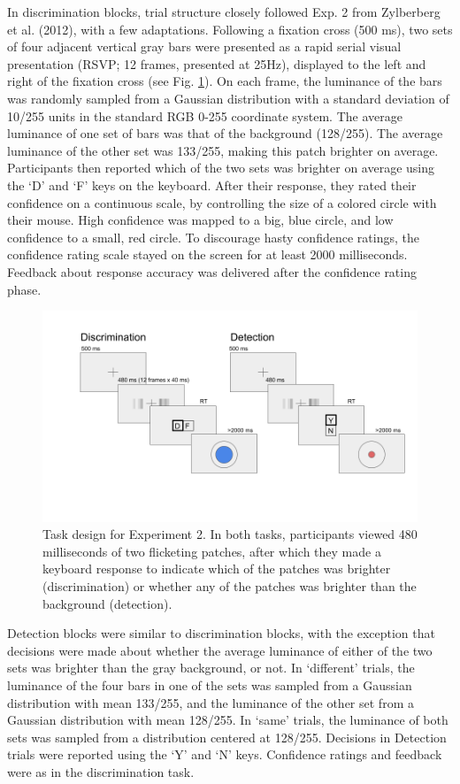 \documentclass[12pt,twoside]{reedthesis}
\begin{document}
In discrimination blocks, trial structure closely followed Exp. 2 from Zylberberg et al. (2012), with a few adaptations. Following a fixation cross (500 ms), two sets of four adjacent vertical gray bars were presented as a rapid serial visual presentation (RSVP; 12 frames, presented at 25Hz), displayed to the left and right of the fixation cross (see Fig. \ref{fig:RC-exp2-design}). On each frame, the luminance of the bars was randomly sampled from a Gaussian distribution with a standard deviation of 10/255 units in the standard RGB 0-255 coordinate system. The average luminance of one set of bars was that of the background (128/255). The average luminance of the other set was 133/255, making this patch brighter on average. Participants then reported which of the two sets was brighter on average using the `D' and `F' keys on the keyboard. After their response, they rated their confidence on a continuous scale, by controlling the size of a colored circle with their mouse. High confidence was mapped to a big, blue circle, and low confidence to a small, red circle. To discourage hasty confidence ratings, the confidence rating scale stayed on the screen for at least 2000 milliseconds. Feedback about response accuracy was delivered after the confidence rating phase.
\begin{figure}
\includegraphics[width=\textwidth]{figure/RC/designExp2} \caption[Experimental design for Exp. 2]{Task design for Experiment 2. In both tasks, participants viewed 480 milliseconds of two flicketing patches, after which they made a keyboard response to indicate which of the patches was brighter (discrimination) or whether any of the patches was brighter than the background (detection). }\label{fig:RC-exp2-design}
\end{figure}
Detection blocks were similar to discrimination blocks, with the exception that decisions were made about whether the average luminance of either of the two sets was brighter than the gray background, or not. In `different' trials, the luminance of the four bars in one of the sets was sampled from a Gaussian distribution with mean 133/255, and the luminance of the other set from a Gaussian distribution with mean 128/255. In `same' trials, the luminance of both sets was sampled from a distribution centered at 128/255. Decisions in Detection trials were reported using the `Y' and `N' keys. Confidence ratings and feedback were as in the discrimination task.
\end{document}

